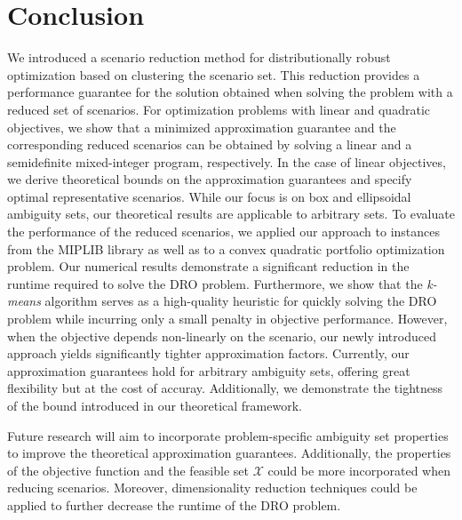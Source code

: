 \documentclass{article}
\newcommand{\mX}{\mathcal{X}}
\begin{document}
\section{Conclusion} %
\label{sec:conclusion}
We introduced a scenario reduction method for distributionally robust optimization based on clustering the scenario set.  
This reduction provides a performance guarantee for the solution obtained when solving the problem with a reduced set of scenarios.  
For optimization problems with linear and quadratic objectives, we show that a minimized approximation guarantee and the corresponding reduced scenarios can be obtained by solving a linear and a semidefinite mixed-integer program, respectively.  
In the case of linear objectives, we derive theoretical bounds on the approximation guarantees and specify optimal representative scenarios.  
While our focus is on box and ellipsoidal ambiguity sets, our theoretical results are applicable to arbitrary sets.  
To evaluate the performance of the reduced scenarios, we applied our approach to instances from the MIPLIB library as well as to a convex quadratic portfolio optimization problem.
Our numerical results demonstrate a significant reduction in the runtime required to solve the DRO problem.  
Furthermore, we show that the \emph{k-means} algorithm serves as a high-quality heuristic for quickly solving the DRO problem while incurring only a small penalty in objective performance.
However, when the objective depends non-linearly on the scenario, our newly introduced approach yields significantly tighter approximation factors.
Currently, our approximation guarantees hold for arbitrary ambiguity sets, offering great flexibility but at the cost of accuray.
Additionally, we demonstrate the tightness of the bound introduced in our theoretical framework.

Future research will aim to incorporate problem-specific ambiguity set properties to improve the theoretical approximation guarantees.  
Additionally, the properties of the objective function and the feasible set $\mX$ could be more incorporated when reducing scenarios.  
Moreover, dimensionality reduction techniques could be applied to further decrease the runtime of the DRO problem.  

\end{document}
